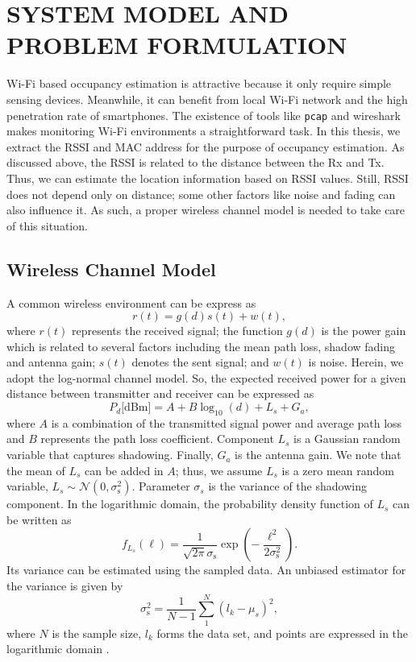 \chapter{SYSTEM MODEL AND PROBLEM FORMULATION}
\label{chapter:SystemModel}

Wi-Fi based occupancy estimation is attractive because it only require simple sensing devices.
Meanwhile, it can benefit from local Wi-Fi network and the high penetration rate of smartphones.
The existence of tools like \texttt{pcap} and wireshark makes monitoring Wi-Fi environments a straightforward task.
In this thesis, we extract the RSSI and MAC address for the purpose of occupancy estimation.
As discussed above, the RSSI is related to the distance between the Rx and Tx.
Thus, we can estimate the location information based on RSSI values.
Still, RSSI does not depend only on distance; some other factors like noise and fading can also influence it.
As such, a proper wireless channel model is needed to take care of this situation.


\section{Wireless Channel Model}
\label{section:channel}

A common wireless environment can be express as
\begin{equation*}
r (t) = g (d) s (t) + w (t) ,
\end{equation*}
where $r (t)$ represents the received signal; the function $g (d)$ is the power gain which is related to several factors including the mean path loss, shadow fading and antenna gain; $s (t)$ denotes the sent signal; and $w (t)$ is noise.
Herein, we adopt the log-normal channel model.
So, the expected received power for a given distance between transmitter and receiver can be expressed as
\begin{equation} \label{channel}
P_{d} \text{[dBm]}
= A + B \log_{10}(d) + L_{s} + G_{a} ,
\end{equation}
where $A$ is a combination of the transmitted signal power and average path loss
and $B$ represents the path loss coefficient.
Component $L_{s}$ is a Gaussian random variable that captures shadowing.
Finally, $G_{a}$ is the antenna gain.
We note that the mean of $L_{s}$ can be added in $A$; thus, we assume $L_{s}$ is a zero mean random variable, $L_{s} \sim \mathcal{N}(0,\sigma_{\mathrm{s}}^2)$.
Parameter $\sigma_{s}$ is the variance of the shadowing component.
In the logarithmic domain, the probability density function of $L_{s}$ can be written as
\begin{equation*}
f_{L_{s}} (\ell)
= \frac{1}{\sqrt{2 \pi} \sigma_{\mathrm{s}}} 
\exp \left( - \frac{\ell^2}{2 \sigma_{\mathrm{s}}^2} \right) .
\end{equation*}
Its variance can be estimated using the sampled data.
An unbiased estimator for the variance is given by~\cite{zwillinger1995crc}
\begin{equation*}
\sigma_{\mathrm{s}}^2 = \frac{1}{N-1} \sum_{1}^{N} (l_{k}-\mu_{s})^2 ,
\end{equation*} 
where $N$ is the sample size, $l_{k}$ forms the data set, and points are expressed in the logarithmic domain \cite{kay1993fundamentals,poor1998introduction}.

